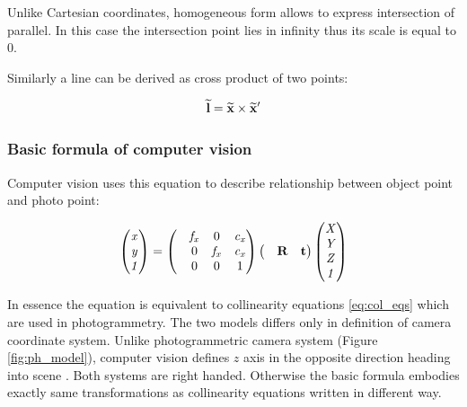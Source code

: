 \documentclass[a4paper,12pt]{article}
\newcommand{\ematr}[1]{
{\bf #1}
}
\newcommand{\evect}[1]{
{\bf #1}
}
\newcommand{\ehvect}[1]{
{\bf \widetilde{#1}}
}
\newcommand{\escal}[1]{
{\it #1}
}
\begin{document}
Unlike Cartesian coordinates, homogeneous form allows to express intersection of parallel. 
In this case the intersection point lies in infinity thus its scale is equal to 0.

Similarly a line can be derived as cross product of two points:

\begin{equation}
\ehvect{l} = \ehvect{x} \times \ehvect{x}'
\end{equation}


\subsubsection{Basic formula of computer vision}

Computer vision uses this equation to describe relationship between
object point and photo point:

\begin{equation}
\begin{pmatrix}
   \escal{x} \\
   \escal{y} \\
   \escal{1} \\
\end{pmatrix}
=
\begin{pmatrix}
   & \escal{f_{x}} & 0     & \escal{c_{x}}\\
   & 0     & \escal{f_{x}} & \escal{c_{x}}\\
   & 0     & 0     & 1\\
\end{pmatrix}
\begin{pmatrix}
&\ematr{R}&\evect{t}\\
\end{pmatrix}
\begin{pmatrix}
   \escal{X} \\
   \escal{Y} \\
   \escal{Z} \\
   \escal{1} \\
\end{pmatrix}
\end{equation}

In essence the equation is equivalent to collinearity equations \eqref{eq:col_eqs} which are used in photogrammetry.
The two models differs only in definition of camera coordinate system.
Unlike photogrammetric camera system (Figure \ref{fig:ph_model}), computer vision defines $z$ axis in the opposite direction heading into scene \cite[p. 156]{Hartley2004}.
Both systems are right handed.
Otherwise the basic formula embodies exactly same transformations as collinearity equations written in different way.
\end{document}
